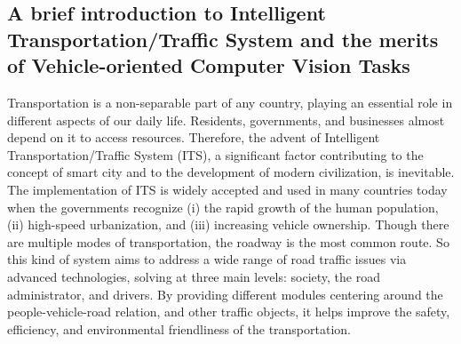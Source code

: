 \subsection{A brief introduction to Intelligent Transportation/Traffic System and the merits of Vehicle-oriented Computer Vision Tasks}
Transportation is a non-separable part of any country, playing an essential role in different aspects of our daily life.
Residents, governments, and businesses almost depend on it to access resources.
Therefore, the advent of Intelligent Transportation/Traffic System (ITS), a significant factor contributing to the concept of smart city and to the development of modern civilization, is inevitable.
The implementation of ITS is widely accepted and used in many countries today when the governments recognize (i) the rapid growth of the human population, (ii) high-speed urbanization, and (iii) increasing vehicle ownership.
Though there are multiple modes of transportation, the roadway is the most common route.
So this kind of system aims to address a wide range of road traffic issues via advanced technologies, solving at three main levels: society, the road administrator, and drivers.
By providing different modules centering around the people-vehicle-road relation, and other traffic objects, it helps improve the safety, efficiency,  and environmental friendliness of the transportation.

